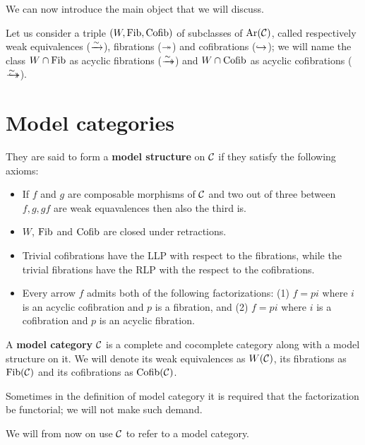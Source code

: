 We can now introduce the main object that we will discuss.

Let us consider a triple $(W, \mathrm{Fib}, \mathrm{Cofib})$ of subclasses of $\mathrm{Ar}(\mathcal{C})$, called respectively weak equivalences ($\xrightarrow{\sim}$), fibrations ($\twoheadrightarrow$) and cofibrations ($\hookrightarrow$); we will name the class $W\cap \mathrm{Fib} $ as acyclic fibrations ($\xrightarrow{\sim}\!\!\!\!\!\!\twoheadrightarrow$) and $W \cap \mathrm{Cofib}$ as acyclic cofibrations ($\xrightarrow{\sim}\!\!\!\!\!\!\hookrightarrow$).

\section{Model categories}

\begin{definition}
	They are said to form a \textbf{model structure} on $\mathcal{C}$ if they satisfy the following axioms:
	\begin{itemize}
		\item[(\textbf{MC1})] If $f$ and $g$ are composable morphisms of $\mathcal{C}$ and two out of three between $f,g,gf$ are weak equavalences then also the third is.
		\item[(\textbf{MC2})] $W$, $\mathrm{Fib}$ and $\mathrm{Cofib}$ are closed under retractions.
		\item[(\textbf{MC3})] Trivial cofibrations have the LLP with respect to the fibrations, while the trivial fibrations have the RLP with the respect to the cofibrations.
		\item[(\textbf{MC4})] Every arrow $f$ admits both of the following factorizations: (1) $f=pi$ where $i$ is an acyclic cofibration and $p$ is a fibration, and (2) $f=pi$ where $i$ is a cofibration and $p$ is an acyclic fibration.
	\end{itemize}
\end{definition}

\begin{definition}
	A \textbf{model category} $\mathcal{C}$ is a complete and cocomplete category along with a model structure on it. We will denote its weak equivalences as $W(\mathcal{C})$, its fibrations as $\mathrm{Fib}(\mathcal{C})$ and its cofibrations as $\mathrm{Cofib}(\mathcal{C})$.
\end{definition}

\begin{remark}
	Sometimes in the definition of model category it is required that the factorization be functorial; we will not make such demand.
\end{remark}



We will from now on use $\mathcal{C}$ to refer to a model category.

